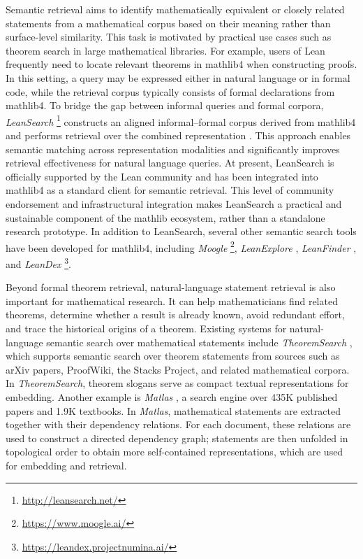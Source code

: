 \documentclass[11pt]{article}
\numberwithin{equation}{section}
\begin{document}
Semantic retrieval aims to identify mathematically equivalent or closely related statements from a mathematical corpus based on their meaning rather than surface-level similarity. This task is motivated by practical use cases such as theorem search in large mathematical libraries. For example, users of Lean frequently need to locate relevant theorems in mathlib4 when constructing proofs. In this setting, a query may be expressed either in natural language or in formal code, while the retrieval corpus typically consists of formal declarations from mathlib4. To bridge the gap between informal queries and formal corpora, \textit{LeanSearch} \footnote{\href{https://leansearch.net/}{http://leansearch.net/}} constructs an aligned informal–formal corpus derived from mathlib4 and performs retrieval over the combined representation \cite{gao-etal-2024-semantic-search}. This approach enables semantic matching across representation modalities and significantly improves retrieval effectiveness for natural language queries. At present, LeanSearch is officially supported by the Lean community and has been integrated into mathlib4 as a standard client for semantic retrieval. This level of community endorsement and infrastructural integration makes LeanSearch a practical and sustainable component of the mathlib ecosystem, rather than a standalone research prototype. In addition to LeanSearch, several other semantic search tools have been developed for mathlib4, including \textit{Moogle} \footnote{\href{https://www.moogle.ai/}{https://www.moogle.ai/}}, \textit{LeanExplore} \cite{asher2025leanexplore}, \textit{LeanFinder} \cite{lu2025lean}, and \textit{LeanDex} \footnote{\href{https://leandex.projectnumina.ai/}{https://leandex.projectnumina.ai/}}. 

Beyond formal theorem retrieval, natural-language statement retrieval is also important for mathematical research. It can help mathematicians find related theorems, determine whether a result is already known, avoid redundant effort, and trace the historical origins of a theorem. Existing systems for natural-language semantic search over mathematical statements include \textit{TheoremSearch} \cite{alexander2026semantic}, which supports semantic search over theorem statements from sources such as arXiv papers, ProofWiki, the Stacks Project, and related mathematical corpora. In \textit{TheoremSearch}, theorem slogans serve as compact textual representations for embedding. Another example is \textit{Matlas} \cite{ju2026matlas}, a search engine over 435K published papers and 1.9K textbooks. In \textit{Matlas}, mathematical statements are extracted together with their dependency relations. For each document, these relations are used to construct a directed dependency graph; statements are then unfolded in topological order to obtain more self-contained representations, which are used for embedding and retrieval.
\end{document}
